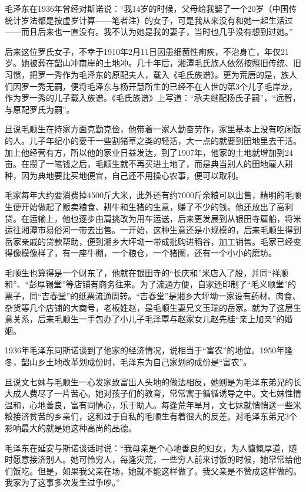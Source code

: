 \documentclass[../../dazhuan.tex]{subfiles}
\begin{document}
毛泽东在1936年曾经对斯诺说：“我14岁的时候，父母给我娶了一个20岁（中国传统计岁法都是按虚岁计算——笔者注）的女子，可是我从来没有和她一起生活过——而且后来也一直没有。我不认为她是我的妻子，当时也几乎没有想到过她。”

后来这位罗氏女子，不幸于1910年2月11日因患细菌性痢疾，不治身亡，年仅21岁。她被葬在韶山冲南岸的土地冲。几十年后，湘潭毛氏族人依然按照旧传统、旧习惯，把罗一秀作为毛泽东的原配夫人，载入《毛氏族谱》。更为荒唐的是，族人们因罗一秀无嗣，便将毛泽东与杨开慧所生的已经不在人世的第3个儿子毛岸龙，作为罗一秀的儿子载入族谱。《毛氏族谱》上写道：“承夫继配杨氏子嗣”，“远智，与原配罗氏为嗣”。

且说毛顺生在持家方面克勤克俭，他带着一家人勤奋劳作，家里基本上没有吃闲饭的人。儿子年纪小的要干一些割猪草之类的轻活，大一点的就要到田地里去干活。加上他经营有方，所以他的家业日益发达，到了1907年，他家的土地就增加到24亩。在攒了一笔钱之后，毛顺生就不再买进土地了，而是典当别人的田地雇人耕种，因为典地要比买地便宜，自己还不用操心农事，便可以取利。

毛家每年大约要消费掉4500斤大米，此外还有约7000斤余粮可以出售，精明的毛顺生便开始做起了贩卖粮食、耕牛和生猪的生意，赚了不少的钱。他还放出了高利贷。在运输上，他也逐步由肩挑改为用车运送，后来更发展到从银田寺雇船，将米运往湘潭市易俗河一带去出售。一开始，这种生意还是小规模的，后来毛顺生得到岳家亲戚的贷款帮助，便到湘乡大坪坳一带成批购进稻谷，加工销售。毛家已经变得像模像样了，有一座牛棚，一个粮仓，一个猪圈，还有一个小小的磨坊。

毛顺生也算得是一个财东了，他就在银田寺的“长庆和”米店入了股，并同“祥顺和”、“彭厚锡堂”等店铺有商务往来。为了流通方便，自家还印制了“毛义顺堂”的票子，同“吉春堂”的纸票流通周转。“吉春堂”是湘乡大坪坳一家设有药材、肉食、杂货等几个店铺的大商号，老板姓赵，是毛顺生妻兄文玉瑞的岳家。就为了这层生意关系，后来毛顺生一手包办了小儿子毛泽覃与赵家女儿赵先桂“亲上加亲”的婚姻。

1936年毛泽东同斯诺谈到了他家的经济情况，说相当于“富农”的地位。1950年隆冬，韶山乡土地改革划成份时，毛泽东为自己家划的成份是“富农”。

且说文七妹与毛顺生一心发家致富出人头地的做法相反，她则是为毛泽东弟兄的长大成人费尽了一片苦心。她对孩子们的教育，常常寓于循循诱导之中。文七妹性情温和，心地善良，富有同情心，乐于助人。每逢荒年旱月，文七妹就悄悄送一些米粮接济贫苦的乡亲们，这和过于自私的毛顺生有着很大的反差。对毛泽东弟兄3个影响最大的就是她这种高尚的品德。

毛泽东在延安与斯诺谈话时说：“我母亲是个心地善良的妇女，为人慷慨厚道，随时愿意接济别人。她可怜穷人，每逢灾荒，一些穷人前来讨饭的时候，她常常给他们饭吃。但是，如果我父亲在场，她就不能这样做了。我父亲是不赞成这样做的。我家为了这事多次发生过争吵。”
\end{document}
